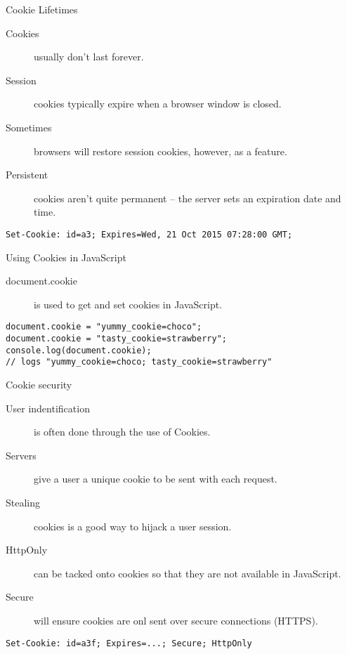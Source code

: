 \documentclass{beamer}
\begin{document}
\begin{frame}[fragile]{Cookie Lifetimes}
  \begin{description}
    \item[Cookies] usually don't last forever.
		\item[Session] cookies typically expire when a browser window is closed.
		\item[Sometimes] browsers will restore session cookies, however, as a feature.
		\item[Persistent] cookies aren't quite permanent -- the server sets an expiration date and time.
  \end{description}
	\hr
  \begin{verbatim}
Set-Cookie: id=a3; Expires=Wed, 21 Oct 2015 07:28:00 GMT;
  \end{verbatim}
\end{frame}


\begin{frame}[fragile]{Using Cookies in JavaScript}
  \begin{description}
    \item[document.cookie] is used to get and set cookies in JavaScript.
  \end{description}
	\hr
  \begin{verbatim}
document.cookie = "yummy_cookie=choco"; 
document.cookie = "tasty_cookie=strawberry"; 
console.log(document.cookie); 
// logs "yummy_cookie=choco; tasty_cookie=strawberry"
  \end{verbatim}
\end{frame}


\begin{frame}[fragile]{Cookie security}
  \begin{description}
    \item[User indentification] is often done through the use of Cookies.
		\item[Servers] give a user a unique cookie to be sent with each request.
		\item[Stealing] cookies is a good way to hijack a user session.
		\item[HttpOnly] can be tacked onto cookies so that they are not available in JavaScript.
		\item[Secure] will ensure cookies are onl sent over secure connections (HTTPS).
  \end{description}
	\hr
  \begin{verbatim}
Set-Cookie: id=a3f; Expires=...; Secure; HttpOnly
  \end{verbatim}
\end{frame}
\end{document}
